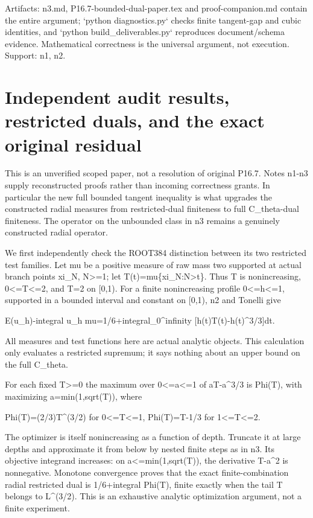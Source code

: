 \documentclass[11pt]{article}
\begin{document}
Artifacts: n3.md, P16.7-bounded-dual-paper.tex and proof-companion.md contain the entire argument; `python diagnostics.py` checks finite tangent-gap and cubic identities, and `python build\_deliverables.py` reproduces document/schema evidence. Mathematical correctness is the universal argument, not execution. Support: n1, n2.

\section*{Independent audit results, restricted duals, and the exact original residual}

This is an unverified scoped paper, not a resolution of original P16.7. Notes n1-n3 supply reconstructed proofs rather than incoming correctness grants. In particular the new full bounded tangent inequality is what upgrades the constructed radial measures from restricted-dual finiteness to full C\_theta-dual finiteness. The operator on the unbounded class in n3 remains a genuinely constructed radial operator.

We first independently check the ROOT384 distinction between its two restricted test families. Let mu be a positive measure of raw mass two supported at actual branch points xi\_N, N>=1; let T(t)=mu\{xi\_N:N>t\}. Thus T is nonincreasing, 0<=T<=2, and T=2 on [0,1). For a finite nonincreasing profile 0<=h<=1, supported in a bounded interval and constant on [0,1), n2 and Tonelli give

E(u\_h)-integral u\_h mu=1/6+integral\_0\textasciicircum{}infinity [h(t)T(t)-h(t)\textasciicircum{}3/3]dt.

All measures and test functions here are actual analytic objects. This calculation only evaluates a restricted supremum; it says nothing about an upper bound on the full C\_theta.

For each fixed T>=0 the maximum over 0<=a<=1 of aT-a\textasciicircum{}3/3 is Phi(T), with maximizing a=min(1,sqrt(T)), where

Phi(T)=(2/3)T\textasciicircum{}(3/2) for 0<=T<=1,
Phi(T)=T-1/3 for 1<=T<=2.

The optimizer is itself nonincreasing as a function of depth. Truncate it at large depths and approximate it from below by nested finite steps as in n3. Its objective integrand increases: on a<=min(1,sqrt(T)), the derivative T-a\textasciicircum{}2 is nonnegative. Monotone convergence proves that the exact finite-combination radial restricted dual is 1/6+integral Phi(T), finite exactly when the tail T belongs to L\textasciicircum{}(3/2). This is an exhaustive analytic optimization argument, not a finite experiment.
\end{document}
